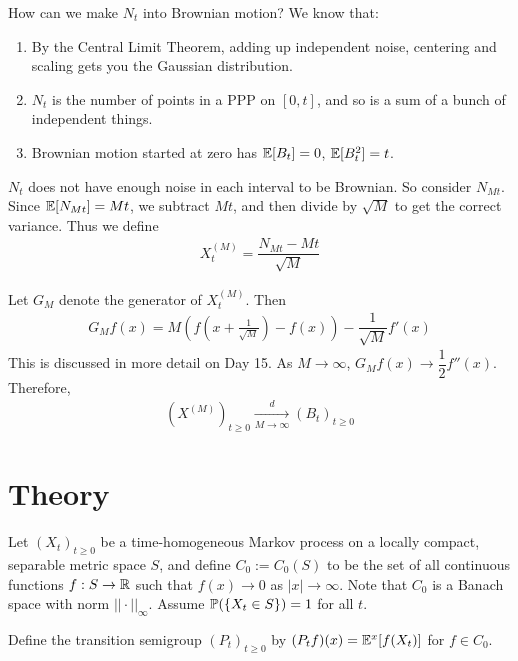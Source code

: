 \documentclass[classnotes]{fillsntsx}
\begin{document}
\begin{exmp}{How can we make $N_t$ into Brownian motion?}
We know that:
\begin{enumerate}
\item By the Central Limit Theorem, adding up independent noise, centering and scaling gets you the Gaussian distribution. 
\item $N_t$ is the number of points in a PPP on $[0, t]$, and so is a sum of a bunch of independent things. 
\item Brownian motion started at zero has $\E[B_t] = 0$, $\E[B_t^2] = t$.
\end{enumerate}

$N_t$ does not have enough noise in each interval to be Brownian. So consider $N_{Mt}$. Since
$\E[N_{Mt}] = Mt$, we subtract $Mt$, and then divide by $\sqrt{M}$ to get the correct variance.
Thus we define
$$\begin{aligned}
X_t^{(M)} = \dfrac{ N_{Mt} - Mt}{\sqrt{M}}
\end{aligned}$$

Let $G_M$ denote the generator of $X_t^{(M)}$. Then
$$\begin{aligned}
G_M f(x) = M \left( f \left( x+ \frac{1}{\sqrt{M}}\right) - f(x) \right) - \dfrac{1}{\sqrt{M}} f'(x)
\end{aligned}$$
This is discussed in more detail on Day 15. 
As $M \to \infty$, $G_M f(x) \to \dfrac{1}{2} f''(x)$. 
Therefore, 
$$\begin{aligned}
(X^{(M)})_{t \geq 0} \xrightarrow[M \to \infty]{d} (B_t)_{t \geq 0}
\end{aligned}$$
\end{exmp}



\section{Theory}

Let $(X_t)_{t \geq 0}$ be a time-homogeneous Markov process on a locally compact, separable metric space $S$, 
and define
$C_0 := C_0(S)$ to be the set of all continuous functions $f: S \to \R$ such that $f(x) \to 0$ as $|x| \to \infty$. 
Note that $C_0$ is a Banach space with norm $|| \cdot ||_{\infty}$. Assume $\P(\{X_t \in S \}) = 1$ for all $t$. 

\begin{defn}
Define the transition semigroup $(P_t)_{t \geq 0}$ by $(P_t f)(x) = \E^{x}[f(X_t)]$ for $f \in C_0$. 
\end{defn}
\end{document}
